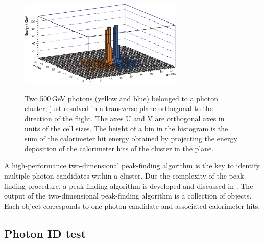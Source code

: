 
\begin{figure}[tbph]
\centering
{\includegraphics[width=0.7\textwidth]{photon/peakFindingMod}}
\caption[Example of projecting a large photon cluster containing two photons.]
{Two 500\,GeV photons (yellow and blue) belonged to  a photon cluster, just resolved in a transverse plane orthogonal to the direction of the flight.  The axes U and V are orthogonal axes in units of the \ECAL cell sizes. The height of a bin in the histogram is the sum of the calorimeter hit energy obtained by projecting the energy deposition of the calorimeter hits of the cluster in the plane.}
\label{fig:photonPeakFinding}
\end{figure}

A high-performance two-dimensional peak-finding algorithm is the key to identify multiple photon candidates within a cluster. Due the complexity of the peak finding procedure, a peak-finding algorithm is developed and discussed in . The output of the two-dimensional peak-finding algorithm is a collection of \ShowerPeak objects. Each \ShowerPeak object corresponds to one photon candidate and associated calorimeter hits.

\subsection{Photon ID test}
\label{sec:photonIDtest}

